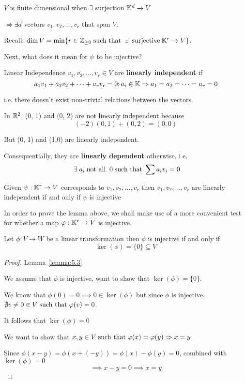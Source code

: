 \begin{remark}
    \(V\) is finite dimensional when \(\exists\) surjection \(\mathbb{K}^d \to V\)

    \(\Leftrightarrow \exists d\) vectors \(v_1, v_2, \dots, v_r\) that span \(V\).

    Recall: \(\dim V = \min\{r \in \bbz_{\geq 0} \st \exists \:\text{surjective}\: \bbk^r \to V\}\).

    Next, what does it mean for \(\psi\) to be injective?
\end{remark}

\begin{definition} {Linear Independence}
    \(v_1, v_2, \dots, v_r \in V\) are \textbf{linearly independent} if \[
        a_1v_1 + a_2v_2 + \cdots + a_rv_r = 0; a_i \in \mathbb{K} \Rightarrow a_1 = a_2 = \cdots = a_r = 0
    \]

    i.e. there doesn't exist non-trivial relations between the vectors.
\end{definition}

\begin{example}
    In \(\mathbb{R}^2\), (0, 1) and (0, 2) are not linearly independent because \[
        (-2) (0, 1) + (0, 2) = (0, 0)
    \]

    But (0, 1) and (1,0) are linearly independent.
\end{example}

Consequentially, they are \textbf{linearly dependent} otherwise, i.e. \[
    \exists a_i \:\text{not all }\: 0 \st \sum a_iv_i = 0
\]
\begin{lemma} \label{lemma:5.2}
    Given \(\psi: \mathbb{K}^r \to V\) corresponds to \(v_1, v_2, \dots, v_r\) then \(v_1, v_2, \dots, v_r\) are linearly independent if and only if \(\psi\) is injective
\end{lemma}


In order to prove the lemma above, we shall make use of a more convenient test for whether a map \(\varphi: \mathbb{K}^r \to V\) is injective.

\begin{lemma} \label{lemma:5.3}
    Let \(\phi: V \to W\) be a linear transformation then \(\phi\) is injective if and only if \[
        \ker(\phi) = \{0\} \subseteq V
    \]
\end{lemma}

\begin{proof} {Lemma \ref{lemma:5.3}}
    \hfill

    \pffwd We assume that \(\phi\) is injective, want to show that \(\ker(\phi) = \{0\}\).

    We know that \(\phi(0) = 0 \implies 0 \in \ker(\phi) \) but since \(\phi\) is injective, \(\nexists v \neq 0 \in V \;\text{such that}\; \varphi(v) = 0\).

    It follows that \(\ker(\phi) = {0}\)

    \pfbwd We want to show that \(x, y \in V \;\text{such that}\; \varphi(x) = \varphi(y) \Rightarrow x = y\)

    Since \(\phi(x-y)  = \phi(x + (-y)) = \phi(x) - \phi(y) = 0\), combined with \(\ker(\phi) = {0}\) \[
        \implies x - y = 0 \implies x =y
    \]
\end{proof}

